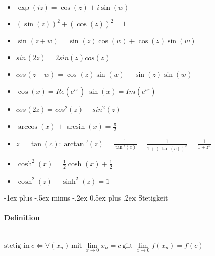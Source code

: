 \documentclass[paper=a3,paper=landscape, fontsize=9pt, DIV=30]{scrartcl}
\makeatletter
\renewcommand{\section}{\@startsection{section}{1}{0mm}%
  {-1ex plus -.5ex minus -.2ex}%
  {0.5ex plus .2ex}%
  {\color{blue}\normalfont\large\bfseries}}
\makeatother
\begin{document}
\begin{multicols*}{4}
  \begin{itemize}
  \item $\exp(iz) = \cos(z)+i\sin(w)$
  \item $(\sin(z))^2+(\cos(z))^2=1$
  \item $\sin(z+w)=\sin(z)\cos(w)+\cos(z)\sin(w)$
  \item $sin(2z)=2sin(z)cos(z)$
  \item $cos(z+w)=\cos(z)\sin(w)-\sin(z)\sin(w)$
  \item $\cos(x)=Re(e^{ix}) \; \sin(x)=Im(e^{ix})$
  \item $cos(2z)=cos^2(z)-sin^2(z)$
  \item $\arccos(x)+\arcsin(x)=\frac{\pi}{2}$
  \item $z=\tan(c): \arctan'(z)=\frac{1}{\tan'(c)}=\frac{1}{1+(\tan(c))^2}=\frac{1}{1+z^2}$
  \item $\cosh^2(x)=\frac{1}{2}\cosh(x)+\frac{1}{2}$
  \item $\cosh^2(z) - \sinh^2(z)=1$
  \end{itemize}


  \section{Stetigkeit}

  \paragraph{Definition}\hspace{0pt} \\
  $\text{stetig in}\ c \Leftrightarrow \forall (x_n) \ \text{mit}\ \lim\limits_{x \rightarrow 0}x_n = c \ \text{gilt}\ \lim\limits_{x \rightarrow 0}f(x_n)=f(c)$


\end{multicols*}
\end{document}
